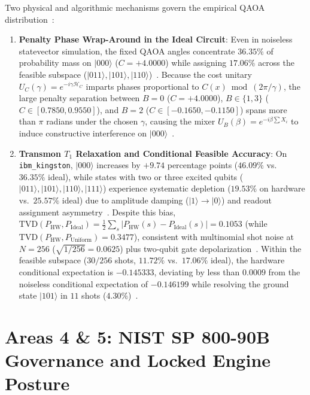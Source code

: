 \documentclass[10pt,letterpaper]{article}
\begin{document}
Two physical and algorithmic mechanisms govern the empirical QAOA distribution~\cite{qfx_doc}:
\begin{enumerate}\setlength{\itemsep}{2pt}\setlength{\parskip}{0pt}
    \item \textbf{Penalty Phase Wrap-Around in the Ideal Circuit}: Even in noiseless statevector simulation, the fixed QAOA angles concentrate $36.35\%$ of probability mass on $\vert 000 \rangle$ ($C = +4.0000$) while assigning $17.06\%$ across the feasible subspace ($\vert 011 \rangle, \vert 101 \rangle, \vert 110 \rangle$)~\cite{qfx_doc}. Because the cost unitary $U_C(\gamma) = e^{-i\gamma \mathcal{H}_C}$ imparts phases proportional to $C(x) \bmod (2\pi/\gamma)$, the large penalty separation between $B=0$ ($C = +4.0000$), $B \in \{1,3\}$ ($C \in [0.7850, 0.9550]$), and $B=2$ ($C \in [-0.1650, -0.1150]$) spans more than $\pi$ radians under the chosen $\gamma$, causing the mixer $U_B(\beta) = e^{-i\beta \sum X_i}$ to induce constructive interference on $\vert 000 \rangle$~\cite{qfx_doc}.
    \item \textbf{Transmon $T_1$ Relaxation and Conditional Feasible Accuracy}: On \texttt{ibm\_kingston}, $\vert 000 \rangle$ increases by $+9.74$ percentage points ($46.09\%$ vs.\ $36.35\%$ ideal), while states with two or three excited qubits ($\vert 011 \rangle, \vert 101 \rangle, \vert 110 \rangle, \vert 111 \rangle$) experience systematic depletion ($19.53\%$ on hardware vs.\ $25.57\%$ ideal) due to amplitude damping ($\vert 1 \rangle \to \vert 0 \rangle$) and readout assignment asymmetry~\cite{qfx_doc}. Despite this bias, $\mathrm{TVD}(P_{\text{HW}}, P_{\text{Ideal}}) = \frac{1}{2}\sum_s \vert P_{\text{HW}}(s) - P_{\text{Ideal}}(s) \vert = 0.1053$ (while $\mathrm{TVD}(P_{\text{HW}}, P_{\text{Uniform}}) = 0.3477$), consistent with multinomial shot noise at $N=256$ ($\sqrt{1/256} = 0.0625$) plus two-qubit gate depolarization~\cite{qfx_doc}. Within the feasible subspace ($30/256$ shots, $11.72\%$ vs.\ $17.06\%$ ideal), the hardware conditional expectation is $-0.145333$, deviating by less than $0.0009$ from the noiseless conditional expectation of $-0.146199$ while resolving the ground state $\vert 101 \rangle$ in $11$ shots ($4.30\%$)~\cite{qfx_doc}.
\end{enumerate}

\section{Areas 4 \& 5: NIST SP 800-90B Governance and Locked Engine Posture}
\end{document}
